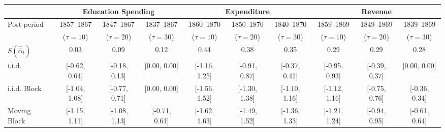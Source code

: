\begin{tabular}{@{}lccccccccc@{}}
		\toprule
		 & \multicolumn{3}{c}{Education Spending}        & \multicolumn{3}{c}{Expenditure}            & \multicolumn{3}{c}{Revenue}                \\ \midrule
Post-period	 & 1857--1867     & 1847--1867      & 1837--1867      & 1860--1870     & 1850--1870     & 1840--1870  	  & 1859--1869      & 1849--1869   	  & 1839--1869   \\
	 	 & ($\tau = 10$)  & ($\tau = 20$)   & ($\tau = 30$)   & ($\tau = 10$)  & ($\tau = 20$)  & ($\tau = 30$)   &  ($\tau = 10$)  &  ($\tau = 20$)  &  ($\tau = 30$)  \\
		\hline
		$S (\hat{\bar{\alpha}}_{t})$                       	   &   0.03        & 	0.09       & 	0.12       &       0.44   &   0.38	     & 	0.35	    & 	0.29       &   0.29       & 	0.28\\
		i.i.d.                      		   & [-0.62, 0.64]  & [-0.18, 0.13]  & [0.00, 0.00]  & [-1.16, 1.25] & [-0.91, 0.87] & [-0.37, 0.41] & [-0.95, 0.93] & [-0.39, 0.37] & [0.00, 0.00] \\
		i.i.d. Block                        & [-1.04, 1.08]  & [-0.77, 0.71]  & [0.00, 0.00]  & [-1.56, 1.52] & [-1.30, 1.38] & [-1.10, 1.16] & [-1.12, 1.16] & [-0.75, 0.76] & [-0.36, 0.34] \\
		Moving Block                        & [-1.15, 1.11]  & [-1.08, 1.13]  & [-0.71, 0.61]  & [-1.62, 1.63] & [-1.49, 1.52] & [-1.36, 1.33] & [-1.21, 1.24] & [-0.94, 0.95] & [-0.61, 0.64] \\ \bottomrule
\end{tabular}
